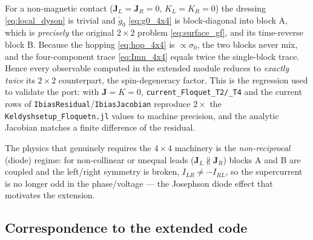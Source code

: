 \documentclass[11pt,a4paper]{article}
\begin{document}
For a non-magnetic contact ($\mathbf J_L=\mathbf J_R=0$, $K_L=K_R=0$) the dressing
\eqref{eq:local_dyson} is trivial and $\check g_0$ \eqref{eq:g0_4x4} is
block-diagonal into block A, which is \emph{precisely} the original $2\times2$
problem \eqref{eq:surface_gf}, and its time-reverse block B.  Because the
hopping \eqref{eq:hop_4x4} is $\propto\sigma_0$, the two blocks never mix, and the
four-component trace \eqref{eq:Imn_4x4} equals twice the single-block trace.
Hence every observable computed in the extended module reduces to \emph{exactly
twice} its $2\times2$ counterpart, the spin-degeneracy factor.  This is the
regression used to validate the port: with $\mathbf J=K=0$,
\texttt{current\_Floquet\_T2/\_T4} and the current rows of
\texttt{IbiasResidual}/\texttt{IbiasJacobian} reproduce $2\times$ the
\texttt{Keldyshsetup\_Floquetn.jl} values to machine precision, and the analytic
Jacobian matches a finite difference of the residual.

The physics that genuinely requires the $4\times4$ machinery is the
\emph{non-reciprocal} (diode) regime: for non-collinear or unequal leads
($\mathbf J_L\nparallel\mathbf J_R$) blocks A and B are coupled and the left/right
symmetry is broken, $I_{LR}\neq-I_{RL}$, so the supercurrent is no longer odd in
the phase/voltage --- the Josephson diode effect that motivates the extension.

\subsection{Correspondence to the extended code}
\label{sec:ysr_codemap}
\end{document}
